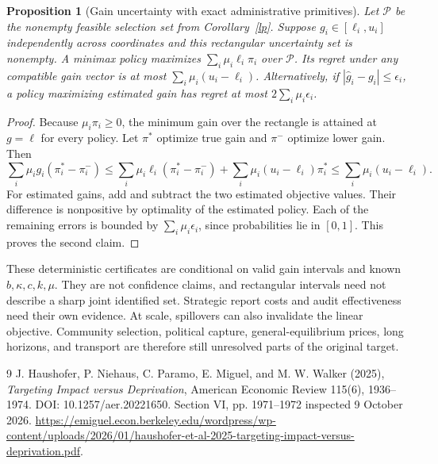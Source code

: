 \documentclass[11pt]{article}
\newtheorem{proposition}[theorem]{Proposition}
\theoremstyle{remark}
\begin{document}
\begin{proposition}[Gain uncertainty with exact administrative primitives]
Let $\mathcal P$ be the nonempty feasible selection set from Corollary~\ref{lp}. Suppose $g_i\in[\ell_i,u_i]$ independently across coordinates and this rectangular uncertainty set is nonempty. A minimax policy maximizes $\sum_i\mu_i\ell_i\pi_i$ over $\mathcal P$. Its regret under any compatible gain vector is at most $\sum_i\mu_i(u_i-\ell_i)$. Alternatively, if $|\widehat g_i-g_i|\leq\epsilon_i$, a policy maximizing estimated gain has regret at most $2\sum_i\mu_i\epsilon_i$.
\end{proposition}
\begin{proof}
Because $\mu_i\pi_i\geq0$, the minimum gain over the rectangle is attained at $g=\ell$ for every policy. Let $\pi^*$ optimize true gain and $\pi^-$ optimize lower gain. Then
\[
 \sum_i\mu_ig_i(\pi_i^*-\pi_i^-)
 \leq\sum_i\mu_i\ell_i(\pi_i^*-\pi_i^-)
       +\sum_i\mu_i(u_i-\ell_i)\pi_i^*
 \leq\sum_i\mu_i(u_i-\ell_i).
\]
For estimated gains, add and subtract the two estimated objective values. Their difference is nonpositive by optimality of the estimated policy. Each of the remaining errors is bounded by $\sum_i\mu_i\epsilon_i$, since probabilities lie in $[0,1]$. This proves the second claim.
\end{proof}

These deterministic certificates are conditional on valid gain intervals and known $b,\kappa,c,k,\mu$. They are not confidence claims, and rectangular intervals need not describe a sharp joint identified set. Strategic report costs and audit effectiveness need their own evidence. At scale, spillovers can also invalidate the linear objective. Community selection, political capture, general-equilibrium prices, long horizons, and transport are therefore still unresolved parts of the original target.

\begin{thebibliography}{9}
 J. Haushofer, P. Niehaus, C. Paramo, E. Miguel, and M. W. Walker (2025), \emph{Targeting Impact versus Deprivation}, American Economic Review 115(6), 1936--1974. DOI: 10.1257/aer.20221650. Section VI, pp. 1971--1972 inspected 9 October 2026. \url{https://emiguel.econ.berkeley.edu/wordpress/wp-content/uploads/2026/01/haushofer-et-al-2025-targeting-impact-versus-deprivation.pdf}.
\end{thebibliography}
\end{document}
